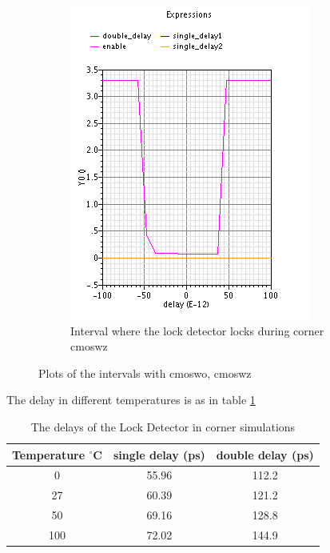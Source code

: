 \documentclass[a4paper,12pt]{article} \usepackage{graphicx}
\newcommand{\degree}{\ensuremath{^\circ}}
\begin{document}
\begin{figure}
\begin{subfigure}[b]{.5\textwidth}
        \centering
        \includegraphics[width=\textwidth]{../Bilder/LD_tran/PD_wz.png}
        \caption{Interval where the lock detector locks during corner cmoswz}
\end{subfigure}
\caption{Plots of the intervals with cmoswo, cmoswz}
\label{fig:LD_wo_wz}
\end{figure}

The delay in different temperatures is as in table \ref{tab:LD_temperature}
\begin{table}[h]
        \centering
        \begin{tabular}{|c|c|c|}
                \hline
                \textbf{Temperature $\degree$C} & \textbf{single delay
                  (ps)} & \textbf{double delay (ps)} \\
                \hline
                0 & 55.96 & 112.2 \\
                27 & 60.39 & 121.2 \\
                50 & 69.16 & 128.8 \\
                100 & 72.02 & 144.9 \\
                \hline
        \end{tabular}
        \caption{The delays of the Lock Detector in corner simulations}
        \label{tab:LD_temperature}
\end{table}
\end{document}
